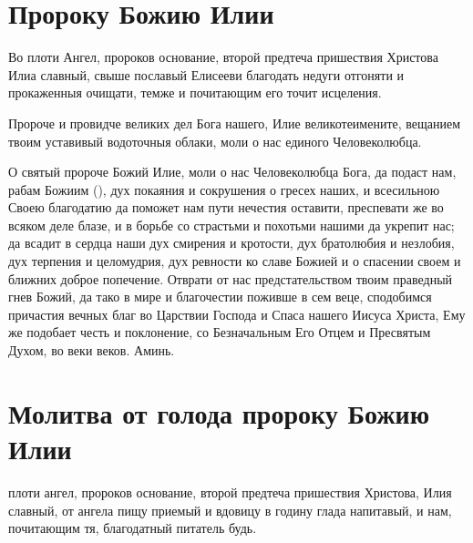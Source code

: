 \section{Пророку Божию Илии}\begin{mymulticols}
 

{\small{}

Во плоти Ангел, пророков основание, второй предтеча пришествия Христова Илиа славный, свыше пославый Елисееви благодать недуги отгоняти и прокаженныя очищати, темже и почитающим его точит исцеления.

\vspace{-\baselineskip}

Пророче и провидче великих дел Бога нашего, Илие великотеимените, вещанием твоим уставивый водоточныя облаки, моли о нас единого Человеколюбца.


О святый пророче Божий Илие, моли о нас Человеколюбца Бога, да подаст нам, рабам Божиим (), дух покаяния и сокрушения о гресех наших, и всесильною Своею благодатию да поможет нам пути нечестия оставити, преспевати же во всяком деле блазе, и в борьбе со страстьми и похотьми нашими да укрепит нас; да всадит в сердца наши дух смирения и кротости, дух братолюбия и незлобия, дух терпения и целомудрия, дух ревности ко славе Божией и о спасении своем и ближних доброе попечение. Отврати от нас предстательством твоим праведный гнев Божий, да тако в мире и благочестии поживше в сем веце, сподобимся причастия вечных благ во Царствии Господа и Спаса нашего Иисуса Христа, Ему же подобает честь и поклонение, со Безначальным Его Отцем и Пресвятым Духом, во веки веков. Аминь.

}

\end{mymulticols}

\vspace{-\baselineskip}\section{Молитва от голода пророку Божию Илии}\begin{mymulticols}
 

{ плоти ангел, пророков основание, второй предтеча пришествия Христова, Илия славный, от ангела пищу приемый и вдовицу в годину глада напитавый, и нам, почитающим тя, благодатный питатель будь.

\par
{}
}

\end{mymulticols}


